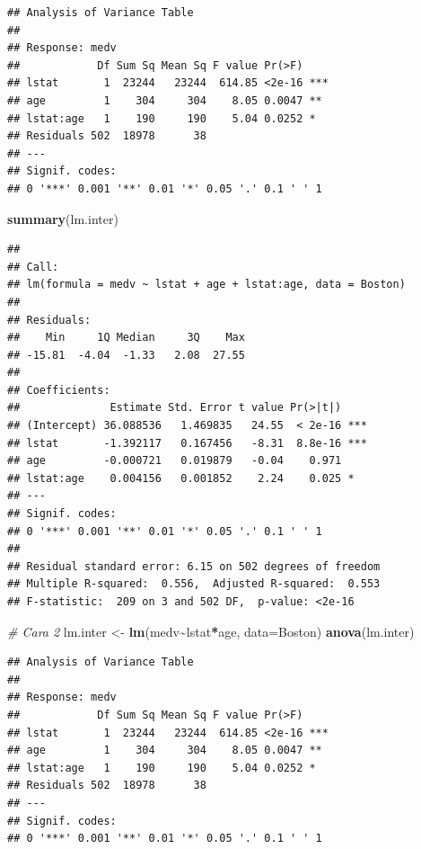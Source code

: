 \documentclass[
]{book}
\newenvironment{Shaded}{\begin{snugshade}}{\end{snugshade}}
\newcommand{\AttributeTok}[1]{\textcolor[rgb]{0.13,0.29,0.53}{#1}}
\newcommand{\CommentTok}[1]{\textcolor[rgb]{0.56,0.35,0.01}{\textit{#1}}}
\newcommand{\FunctionTok}[1]{\textcolor[rgb]{0.13,0.29,0.53}{\textbf{#1}}}
\newcommand{\NormalTok}[1]{#1}
\newcommand{\OtherTok}[1]{\textcolor[rgb]{0.56,0.35,0.01}{#1}}
\newcommand{\SpecialCharTok}[1]{\textcolor[rgb]{0.81,0.36,0.00}{\textbf{#1}}}
\theoremstyle{definition}
\theoremstyle{definition}
\theoremstyle{definition}
\theoremstyle{definition}
\theoremstyle{remark}
\begin{document}
\begin{verbatim}
## Analysis of Variance Table
## 
## Response: medv
##            Df Sum Sq Mean Sq F value Pr(>F)    
## lstat       1  23244   23244  614.85 <2e-16 ***
## age         1    304     304    8.05 0.0047 ** 
## lstat:age   1    190     190    5.04 0.0252 *  
## Residuals 502  18978      38                   
## ---
## Signif. codes:  
## 0 '***' 0.001 '**' 0.01 '*' 0.05 '.' 0.1 ' ' 1
\end{verbatim}

\begin{Shaded}
\begin{Highlighting}[]
\FunctionTok{summary}\NormalTok{(lm.inter)}
\end{Highlighting}
\end{Shaded}

\begin{verbatim}
## 
## Call:
## lm(formula = medv ~ lstat + age + lstat:age, data = Boston)
## 
## Residuals:
##    Min     1Q Median     3Q    Max 
## -15.81  -4.04  -1.33   2.08  27.55 
## 
## Coefficients:
##              Estimate Std. Error t value Pr(>|t|)    
## (Intercept) 36.088536   1.469835   24.55  < 2e-16 ***
## lstat       -1.392117   0.167456   -8.31  8.8e-16 ***
## age         -0.000721   0.019879   -0.04    0.971    
## lstat:age    0.004156   0.001852    2.24    0.025 *  
## ---
## Signif. codes:  
## 0 '***' 0.001 '**' 0.01 '*' 0.05 '.' 0.1 ' ' 1
## 
## Residual standard error: 6.15 on 502 degrees of freedom
## Multiple R-squared:  0.556,  Adjusted R-squared:  0.553 
## F-statistic:  209 on 3 and 502 DF,  p-value: <2e-16
\end{verbatim}

\begin{Shaded}
\begin{Highlighting}[]
\CommentTok{\# Cara 2}
\NormalTok{lm.inter }\OtherTok{\textless{}{-}} \FunctionTok{lm}\NormalTok{(medv}\SpecialCharTok{\textasciitilde{}}\NormalTok{lstat}\SpecialCharTok{*}\NormalTok{age, }\AttributeTok{data=}\NormalTok{Boston)}
\FunctionTok{anova}\NormalTok{(lm.inter)}
\end{Highlighting}
\end{Shaded}

\begin{verbatim}
## Analysis of Variance Table
## 
## Response: medv
##            Df Sum Sq Mean Sq F value Pr(>F)    
## lstat       1  23244   23244  614.85 <2e-16 ***
## age         1    304     304    8.05 0.0047 ** 
## lstat:age   1    190     190    5.04 0.0252 *  
## Residuals 502  18978      38                   
## ---
## Signif. codes:  
## 0 '***' 0.001 '**' 0.01 '*' 0.05 '.' 0.1 ' ' 1
\end{verbatim}
\end{document}
